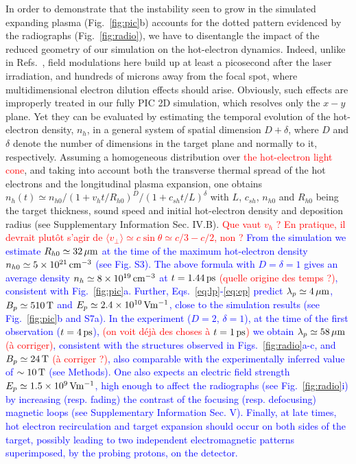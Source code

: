 \documentclass[aps,twocolumn,showpacs,superscriptaddress]{revtex4}
\begin{document}
In order to demonstrate that the instability seen to grow in the simulated expanding plasma (Fig.~\ref{fig:pic}b) accounts for the dotted pattern evidenced by the radiographs (Fig.~\ref{fig:radio}), we have to disentangle the impact of the reduced geometry of our simulation on the hot-electron dynamics. Indeed, unlike in Refs.~\cite{PRL_Gode_2017, NJP_Scott_2017}, field modulations here build up at least a picosecond after the laser irradiation, and hundreds of microns away from the focal spot, where multidimensional electron dilution effects should arise. Obviously, such effects are improperly treated in our fully PIC 2D simulation, which resolves only the $x-y$ plane. Yet they can be evaluated by estimating the temporal evolution of the hot-electron density, $n_h$, in a general system of spatial dimension $D+\delta$, where $D$ and $\delta$ denote the number of dimensions in the target plane and normally to it, respectively. Assuming a homogeneous distribution over \textcolor{red}{the hot-electron light cone}, and taking into account both the transverse thermal spread of the hot electrons and the longitudinal plasma expansion, one obtains $n_h(t) \simeq n_{h0}/(1+ v_h t /R_{h0})^D/(1+c_{sh} t/L)^\delta$ with $L$, $c_{sh}$, $n_{h0}$ and $R_{h0}$ being the target thickness, sound speed and initial hot-electron density and  deposition radius (see Supplementary Information Sec. IV.B).
\textcolor{red}{Que vaut $v_h$ ? En pratique, il devrait plut\^ot s'agir de $\langle v_\perp \rangle \simeq c\sin \theta \simeq c/3-c/2$, non ?}
\textcolor{blue}{From the simulation we estimate $R_{h0} \simeq 32\,\rm \mu m$ at the time of the maximum hot-electron density $n_{h0} \simeq 5\times 10^{21}\,\rm cm^{-3}$ (see Fig. S3). The above formula with $D=\delta=1$ gives an average density $n_h \simeq 8 \times 10^{19}\,\rm cm^{-3}$ at $t = 1.44\,\rm ps$ \textcolor{red}{(quelle origine des temps ?)}, consistent with Fig.~\ref{fig:pic}a. Further, Eqs.~\eqref{eq:lp}-\eqref{eq:ep} predict $\lambda_p \simeq 4 \,\rm \mu m$, $B_p \simeq 510\,\rm T$ and $E_p \simeq 2.4\times10^{10}\,\rm Vm^{-1}$, close to the simulation results (see Fig.~\ref{fig:pic}b and S7a). In the experiment ($D=2$, $\delta=1$), at the time of the first observation ($t=4\,\rm ps$),
\textcolor{red}{(on voit d\'ej\`a des choses \`a $t=1\,\rm ps$)} we obtain
$\lambda_p \simeq 58 \,\rm \mu m$ \textcolor{red}{(\`a corriger)}, consistent with the structures observed in Figs.~\ref{fig:radio}a-c, and $B_p\simeq 24\,\rm T$ \textcolor{red}{(\`a corriger ?)}, also comparable with the experimentally inferred value of $\sim 10\,\rm T$ (see Methods). One also expects an electric field strength $E_p \simeq 1.5\times 10^9\,\rm V m^{-1}$, high enough to affect the radiographs (see Fig.~\ref{fig:radio}i) by increasing (resp. fading) the contrast of the focusing (resp. defocusing) magnetic loops (see Supplementary Information Sec. V). Finally, at late times, hot electron recirculation and target expansion should occur on both sides of the target, possibly leading to two independent electromagnetic patterns superimposed, by the probing protons, on the detector.}
\end{document}
